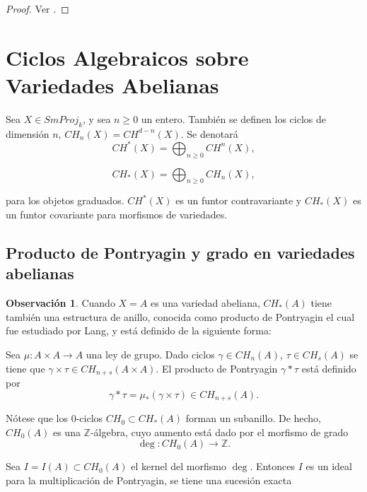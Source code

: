 \documentclass[10pt]{amsart}
\theoremstyle{definition}
\newtheorem{obs}[definition]{Observaci\'on}
\theoremstyle{remark}
\theoremstyle{definition}
\begin{document}
\begin{proof}
Ver \cite[Thm. 1.3]{L}.
\end{proof}




 \newpage
\section{Ciclos Algebraicos sobre Variedades Abelianas}
Sea $X \in SmProj_{\mathit{k}}$, y sea $n\geq 0$ un entero. También se definen los ciclos de dimensión $n$, $CH_{n}(X)=CH^{d-n}(X)$. Se denotará
\begin{equation*}
CH^{*}(X)=\bigoplus_{n\geq 0} CH^{n}(X),
\end{equation*}

\begin{equation*}
CH_{*}(X)=\bigoplus_{n \geq 0} CH_{n}(X),
\end{equation*}

para los objetos graduados. $CH^{*}(X)$ es un funtor contravariante y $CH_{*}(X)$ es un funtor covariante para morfismos de variedades.

\subsection{Producto de Pontryagin y grado en variedades abelianas}

\begin{obs}
Cuando $X=A$ es una variedad abeliana, $CH_{*}(A)$ tiene también una estructura de anillo, conocida como producto de Pontryagin el cual fue estudiado por Lang, y está definido de la siguiente forma:

Sea $\mu:A \times A \rightarrow A$ una ley de grupo. Dado ciclos $\gamma \in CH_{n}(A)$, $\tau \in CH_{s}(A)$  se tiene que $\gamma \times \tau \in CH_{n+s}(A \times A)$. El producto de Pontryagin $\gamma * \tau$ está definido por 
\begin{equation*}
\gamma * \tau = \mu_{*}(\gamma \times \tau) \in CH_{n+s}(A).
\end{equation*}
\end{obs}

Nótese que los $0$-ciclos $CH_{0} \subset CH_{*}(A)$ forman un subanillo. De hecho, $CH_{0}(A)$ es una $\mathbb{Z}$-álgebra, cuyo aumento está dado por el morfismo de grado
\begin{equation*}
\deg:CH_{0}(A) \rightarrow \mathbb{Z}.
\end{equation*}

Sea $I=I(A) \subset CH_{0}(A)$ el kernel del morfismo $\deg$. Entonces $I$ es un ideal para la multiplicación de Pontryagin, se tiene una sucesión exacta
\end{document}
